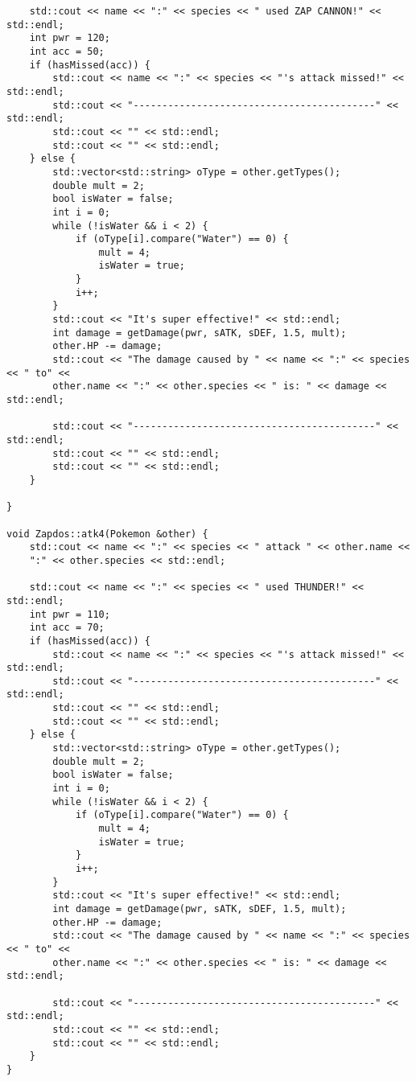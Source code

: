 \documentclass[11pt]{article}
\begin{document}
\begin{itemize}
\begin{lstlisting}
    std::cout << name << ":" << species << " used ZAP CANNON!" << std::endl;
    int pwr = 120;
    int acc = 50;
    if (hasMissed(acc)) {
        std::cout << name << ":" << species << "'s attack missed!" << std::endl;
        std::cout << "------------------------------------------" << std::endl;
        std::cout << "" << std::endl;
        std::cout << "" << std::endl;
    } else {
        std::vector<std::string> oType = other.getTypes();
        double mult = 2;
        bool isWater = false;
        int i = 0;
        while (!isWater && i < 2) {
            if (oType[i].compare("Water") == 0) {
                mult = 4;
                isWater = true;
            }
            i++;
        }
        std::cout << "It's super effective!" << std::endl;
        int damage = getDamage(pwr, sATK, sDEF, 1.5, mult);
        other.HP -= damage;
        std::cout << "The damage caused by " << name << ":" << species << " to" <<
        other.name << ":" << other.species << " is: " << damage << std::endl;
        
        std::cout << "------------------------------------------" << std::endl;
        std::cout << "" << std::endl;
        std::cout << "" << std::endl;
    }

}

void Zapdos::atk4(Pokemon &other) {
    std::cout << name << ":" << species << " attack " << other.name <<
    ":" << other.species << std::endl;
    
    std::cout << name << ":" << species << " used THUNDER!" << std::endl;
    int pwr = 110;
    int acc = 70;
    if (hasMissed(acc)) {
        std::cout << name << ":" << species << "'s attack missed!" << std::endl;
        std::cout << "------------------------------------------" << std::endl;
        std::cout << "" << std::endl;
        std::cout << "" << std::endl;
    } else {
        std::vector<std::string> oType = other.getTypes();
        double mult = 2;
        bool isWater = false;
        int i = 0;
        while (!isWater && i < 2) {
            if (oType[i].compare("Water") == 0) {
                mult = 4;
                isWater = true;
            }
            i++;
        }
        std::cout << "It's super effective!" << std::endl;
        int damage = getDamage(pwr, sATK, sDEF, 1.5, mult);
        other.HP -= damage;
        std::cout << "The damage caused by " << name << ":" << species << " to" <<
        other.name << ":" << other.species << " is: " << damage << std::endl;
        
        std::cout << "------------------------------------------" << std::endl;
        std::cout << "" << std::endl;
        std::cout << "" << std::endl;
    }
}


\end{lstlisting}
\end{itemize}
\end{document}
